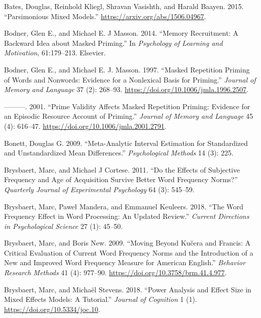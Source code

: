 \documentclass[
]{interact}
\newlength{\cslhangindent}
\newenvironment{CSLReferences}[2] %
 {\begin{list}{}{%
  \setlength{\itemindent}{0pt}
  \setlength{\leftmargin}{0pt}
  \setlength{\parsep}{0pt}
  \ifodd #1
   \setlength{\leftmargin}{\cslhangindent}
   \setlength{\itemindent}{-1\cslhangindent}
  \fi
  \setlength{\itemsep}{#2\baselineskip}}}
 {\end{list}}
\begin{document}
\begin{CSLReferences}{1}{0}
Bates, Douglas, Reinhold Kliegl, Shravan Vasishth, and Harald Baayen.
2015. {``Parsimonious Mixed Models.''}
\url{https://arxiv.org/abs/1506.04967}.

Bodner, Glen E., and Michael E. J Masson. 2014. {``Memory Recruitment: A
Backward Idea about Masked Priming.''} In \emph{Psychology of Learning
and Motivation}, 61:179--213. Elsevier.

Bodner, Glen E., and Michael E. J. Masson. 1997. {``Masked Repetition
Priming of Words and Nonwords: Evidence for a Nonlexical Basis for
Priming.''} \emph{Journal of Memory and Language} 37 (2): 268--93.
\url{https://doi.org/10.1006/jmla.1996.2507}.

---------. 2001. {``Prime Validity Affects Masked Repetition Priming:
Evidence for an Episodic Resource Account of Priming.''} \emph{Journal
of Memory and Language} 45 (4): 616--47.
\url{https://doi.org/10.1006/jmla.2001.2791}.

Bonett, Douglas G. 2009. {``Meta-Analytic Interval Estimation for
Standardized and Unstandardized Mean Differences.''} \emph{Psychological
Methods} 14 (3): 225.

Brysbaert, Marc, and Michael J Cortese. 2011. {``Do the Effects of
Subjective Frequency and Age of Acquisition Survive Better Word
Frequency Norms?''} \emph{Quarterly Journal of Experimental Psychology}
64 (3): 545--59.

Brysbaert, Marc, Paweł Mandera, and Emmanuel Keuleers. 2018. {``The Word
Frequency Effect in Word Processing: An Updated Review.''} \emph{Current
Directions in Psychological Science} 27 (1): 45--50.

Brysbaert, Marc, and Boris New. 2009. {``Moving Beyond Ku{č}era and
Francis: A Critical Evaluation of Current Word Frequency Norms and the
Introduction of a New and Improved Word Frequency Measure for American
English.''} \emph{Behavior Research Methods} 41 (4): 977--90.
\url{https://doi.org/10.3758/brm.41.4.977}.

Brysbaert, Marc, and Michaël Stevens. 2018. {``Power Analysis and Effect
Size in Mixed Effects Models: A Tutorial.''} \emph{Journal of Cognition}
1 (1). \url{https://doi.org/10.5334/joc.10}.


\end{CSLReferences}
\end{document}
